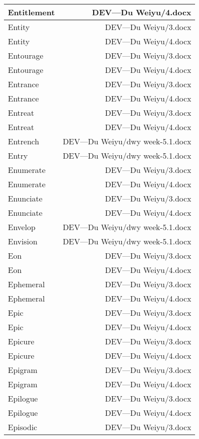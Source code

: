 \documentclass{article}
\begin{document}
\begin{center}
\begin{longtable}{|l|r|}
\hline
Entitlement  &  DEV---Du Weiyu/4.docx\\  
\hline
Entity  &  DEV---Du Weiyu/3.docx\\  
\hline
Entity  &  DEV---Du Weiyu/4.docx\\  
\hline
Entourage  &  DEV---Du Weiyu/3.docx\\  
\hline
Entourage  &  DEV---Du Weiyu/4.docx\\  
\hline
Entrance  &  DEV---Du Weiyu/3.docx\\  
\hline
Entrance  &  DEV---Du Weiyu/4.docx\\  
\hline
Entreat  &  DEV---Du Weiyu/3.docx\\  
\hline
Entreat  &  DEV---Du Weiyu/4.docx\\  
\hline
Entrench  &  DEV---Du Weiyu/dwy week-5.1.docx\\  
\hline
Entry  &  DEV---Du Weiyu/dwy week-5.1.docx\\  
\hline
Enumerate  &  DEV---Du Weiyu/3.docx\\  
\hline
Enumerate  &  DEV---Du Weiyu/4.docx\\  
\hline
Enunciate  &  DEV---Du Weiyu/3.docx\\  
\hline
Enunciate  &  DEV---Du Weiyu/4.docx\\  
\hline
Envelop  &  DEV---Du Weiyu/dwy week-5.1.docx\\  
\hline
Envision  &  DEV---Du Weiyu/dwy week-5.1.docx\\  
\hline
Eon  &  DEV---Du Weiyu/3.docx\\  
\hline
Eon  &  DEV---Du Weiyu/4.docx\\  
\hline
Ephemeral  &  DEV---Du Weiyu/3.docx\\  
\hline
Ephemeral  &  DEV---Du Weiyu/4.docx\\  
\hline
Epic  &  DEV---Du Weiyu/3.docx\\  
\hline
Epic  &  DEV---Du Weiyu/4.docx\\  
\hline
Epicure  &  DEV---Du Weiyu/3.docx\\  
\hline
Epicure  &  DEV---Du Weiyu/4.docx\\  
\hline
Epigram  &  DEV---Du Weiyu/3.docx\\  
\hline
Epigram  &  DEV---Du Weiyu/4.docx\\  
\hline
Epilogue  &  DEV---Du Weiyu/3.docx\\  
\hline
Epilogue  &  DEV---Du Weiyu/4.docx\\  
\hline
Episodic  &  DEV---Du Weiyu/3.docx\\  

\end{longtable}
\end{center}
\end{document}
